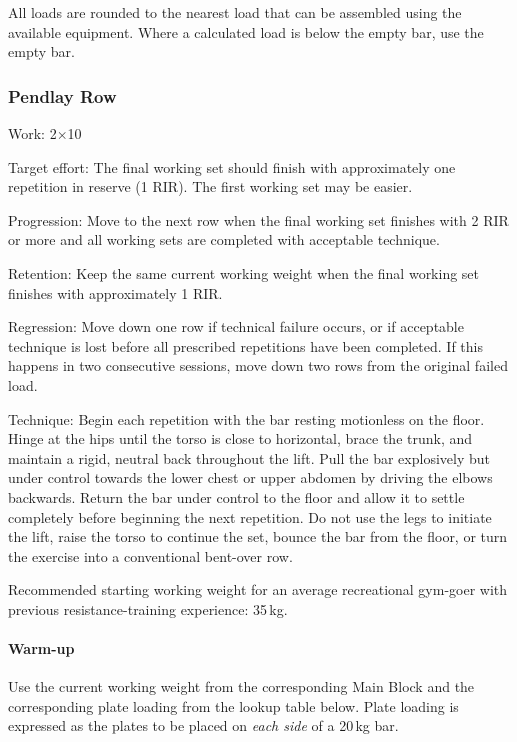 \documentclass[11pt,a4paper]{article}
\begin{document}
All loads are rounded to the nearest load that can be assembled using the available equipment. Where a calculated load is below the empty bar, use the empty bar.

\newpage
\subsubsection{Pendlay Row}

Work: 2$\times$10

Target effort: The final working set should finish with approximately one repetition in reserve (1 RIR). The first working set may be easier.

Progression: Move to the next row when the final working set finishes with 2 RIR or more and all working sets are completed with acceptable technique.

Retention: Keep the same current working weight when the final working set finishes with approximately 1 RIR.

Regression: Move down one row if technical failure occurs, or if acceptable technique is lost before all prescribed repetitions have been completed. If this happens in two consecutive sessions, move down two rows from the original failed load.

Technique: Begin each repetition with the bar resting motionless on the floor. Hinge at the hips until the torso is close to horizontal, brace the trunk, and maintain a rigid, neutral back throughout the lift. Pull the bar explosively but under control towards the lower chest or upper abdomen by driving the elbows backwards. Return the bar under control to the floor and allow it to settle completely before beginning the next repetition. Do not use the legs to initiate the lift, raise the torso to continue the set, bounce the bar from the floor, or turn the exercise into a conventional bent-over row.

Recommended starting working weight for an average recreational gym-goer with previous resistance-training experience: 35\,kg.

\paragraph{Warm-up}

Use the current working weight from the corresponding Main Block and the corresponding plate loading from the lookup table below. Plate loading is expressed as the plates to be placed on \emph{each side} of a 20\,kg bar.
\end{document}
